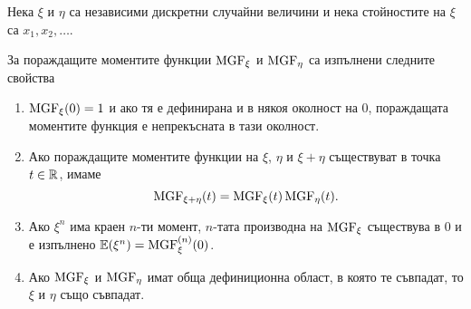 \documentclass[numbers=endperiod, DIV=15, bibliography=totocnumbered]{scrartcl}
\begin{document}
\begin{theorem}
  Нека $\xi$ и $\eta$ са независими дискретни случайни величини и нека стойностите на $\xi$ са $x_1, x_2, \ldots$.

  За пораждащите моментите функции $\operatorname{MGF}_\xi$ и $\operatorname{MGF}_\eta$ са изпълнени следните свойства
  \begin{enumerate}
    \item $\operatorname{MGF}_\xi(0) = 1$ и ако тя е дефинирана и в някоя околност на $0$, пораждащата моментите функция е непрекъсната в тази околност.

    \item Ако пораждащите моментите функции на $\xi$, $\eta$ и $\xi + \eta$ съществуват в точка $t \in \mathbb{R}$, имаме
    \begin{displaymath}
      \operatorname{MGF}_{\xi + \eta}(t) = \operatorname{MGF}_\xi(t) \operatorname{MGF}_\eta(t).
    \end{displaymath}

    \item Ако $\xi^n$ има краен $n$-ти момент, $n$-тата производна на $\operatorname{MGF}_\xi$ съществува в $0$ и е изпълнено $\mathbb{E}(\xi^n) = \operatorname{MGF}_\xi^{(n)} (0)$.

    \item Ако $\operatorname{MGF}_\xi$ и $\operatorname{MGF}_\eta$ имат обща дефиниционна област, в която те съвпадат, то $\xi$ и $\eta$ също съвпадат.
  \end{enumerate}
\end{theorem}
\end{document}
